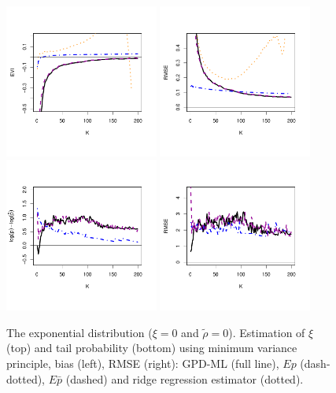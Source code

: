 \documentclass[twoside,leqno,11pt]{article}
\begin{document}
 \begin{figure}[!ht]
  \centering
\includegraphics[width=0.45\textwidth]{exponentialGPD_evi.pdf} 
\includegraphics[width=0.45\textwidth]{exponentialGPD_rmse.pdf} \\
\includegraphics[width=0.45\textwidth]{exponentialGPD_tail.pdf}
\includegraphics[width=0.45\textwidth]{exponentialGPD_tail_rmse.pdf}  
 \caption{ The exponential distribution ($\xi=0$ and $\tilde\rho=0$). Estimation of $\xi$ (top) and tail probability (bottom) using minimum variance principle, bias (left), RMSE (right): GPD-ML (full line),  $Ep$ (dash-dotted), $E\bar{p}$ (dashed) and ridge regression estimator (dotted).}
\end{figure}
\end{document}
